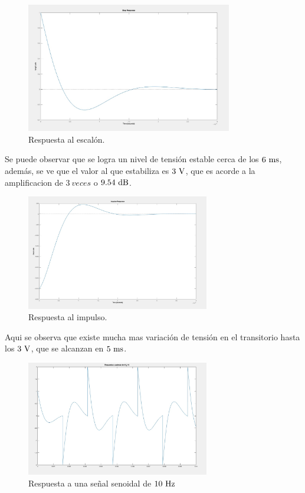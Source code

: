 
\begin{figure}[hbt]
	\centering
	\includegraphics[width=9cm]{imagenes/STEP.jpg}
	\caption{Respuesta al escal\'on.}
\end{figure}
Se puede observar que se logra un nivel de tensi\'on estable cerca de los $6 \ \si{\milli\second}$, adem\'as, se ve que el valor al que estabiliza es $3 \ \si{\volt}$, que es acorde a la  amplificacion de $3\ veces$ o $9.54 \dB$.\\

\begin{figure}[hbt]
	\centering
	\includegraphics[width=8cm]{imagenes/IMPULSE}	\caption{Respuesta al impulso.}
\end{figure}
Aqui se observa que existe mucha mas variaci\'on de tensi\'on en el transitorio hasta los $3 \ \si{\volt}$, que se alcanzan en $5 \ \si{\milli\second}$.\\

\begin{figure}[hbt]
	\centering
	\includegraphics[width=8cm]{imagenes/sen f:10.jpg}	\caption{Respuesta a una señal senoidal de $10\ \si{\hertz}$}	
\end{figure}


